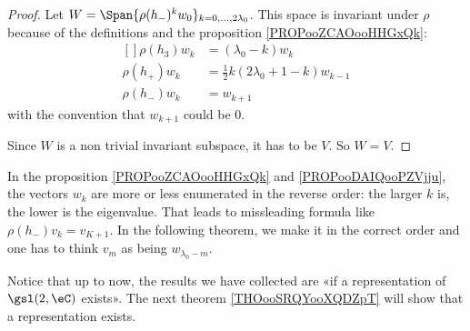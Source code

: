\begin{proof}
	Let \(  W=\Span\{  \rho(h_-)^kw_0 \}_{k=0,\ldots, 2\lambda_0}\). This space is invariant under \( \rho\) because of the definitions and the proposition \ref{PROPooZCAOooHHGxQk}:
	\begin{equation}
		\begin{aligned}[]
			\rho(h_3)w_k & =(\lambda_0-k)w_k                      \\
			\rho(h_+)w_k & =\frac{ 1 }{2}k(2\lambda_0+1-k)w_{k-1} \\
			\rho(h_-)w_k & =w_{k+1}
		\end{aligned}
	\end{equation}
	with the convention that \( w_{k+1}\) could be \( 0\).

	Since \( W\) is a non trivial invariant subspace, it has to be \( V\). So \( W=V\).
\end{proof}

\begin{normaltext}
	In the proposition \ref{PROPooZCAOooHHGxQk} and \ref{PROPooDAIQooPZVjju}, the vectors \( w_k\) are more or less enumerated in the reverse order: the larger \( k\) is, the lower is the eigenvalue. That leads to missleading formula like \( \rho(h_-)v_k=v_{K+1}\). In the following theorem, we make it in the correct order and one has to think \( v_m\) as being \( w_{\lambda_0-m}\).

	Notice that up to now, the results we have collected are «if a representation of \( \gsl(2,\eC)\) exists». The next theorem \ref{THOooSRQYooXQDZpT} will show that a representation exists.
\end{normaltext}


